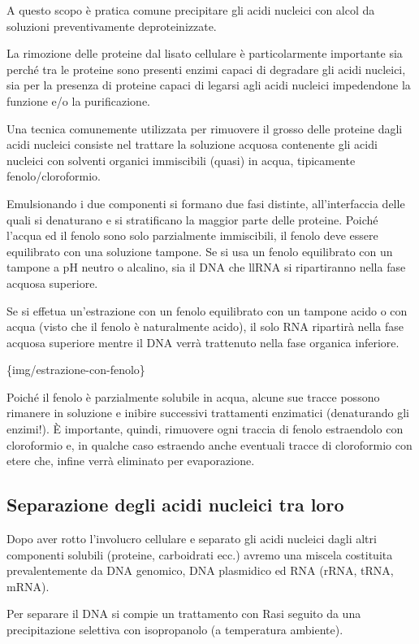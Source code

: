 \documentclass[]{article}
\begin{document}
A questo scopo è pratica comune precipitare gli acidi nucleici con alcol
da soluzioni preventivamente deproteinizzate.

La rimozione delle proteine dal lisato cellulare è particolarmente
importante sia perché tra le proteine sono presenti enzimi capaci di
degradare gli acidi nucleici, sia per la presenza di proteine capaci di
legarsi agli acidi nucleici impedendone la funzione e/o la
purificazione.

Una tecnica comunemente utilizzata per rimuovere il grosso delle
proteine dagli acidi nucleici consiste nel trattare la soluzione acquosa
contenente gli acidi nucleici con solventi organici immiscibili (quasi)
in acqua, tipicamente fenolo/cloroformio.

Emulsionando i due componenti si formano due fasi distinte,
all'interfaccia delle quali si denaturano e si stratificano la maggior
parte delle proteine. Poiché l'acqua ed il fenolo sono solo parzialmente
immiscibili, il fenolo deve essere equilibrato con una soluzione
tampone. Se si usa un fenolo equilibrato con un tampone a pH neutro o
alcalino, sia il DNA che llRNA si ripartiranno nella fase acquosa
superiore.

Se si effetua un'estrazione con un fenolo equilibrato con un tampone
acido o con acqua (visto che il fenolo è naturalmente acido), il solo
RNA ripartirà nella fase acquosa superiore mentre il DNA verrà
trattenuto nella fase organica inferiore.

\{img/estrazione-con-fenolo\}

Poiché il fenolo è parzialmente solubile in acqua, alcune sue tracce
possono rimanere in soluzione e inibire successivi trattamenti
enzimatici (denaturando gli enzimi!). È importante, quindi, rimuovere
ogni traccia di fenolo estraendolo con cloroformio e, in qualche caso
estraendo anche eventuali tracce di cloroformio con etere che, infine
verrà eliminato per evaporazione.

\subsection{Separazione degli acidi nucleici tra
loro}\label{separazione-degli-acidi-nucleici-tra-loro}

Dopo aver rotto l'involucro cellulare e separato gli acidi nucleici
dagli altri componenti solubili (proteine, carboidrati ecc.) avremo una
miscela costituita prevalentemente da DNA genomico, DNA plasmidico ed
RNA (rRNA, tRNA, mRNA).

Per separare il DNA si compie un trattamento con Rasi seguito da una
precipitazione selettiva con isopropanolo (a temperatura ambiente).
\end{document}
